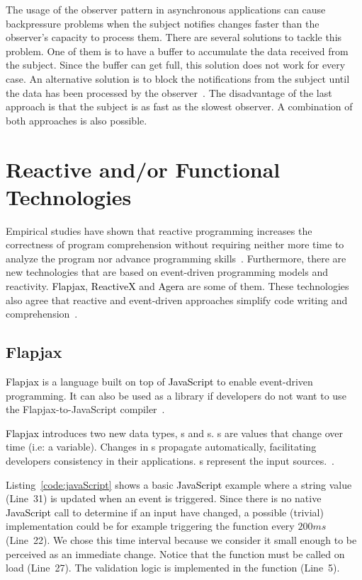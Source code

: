 \documentclass[type=bsc,accentcolor=tud9c]{tudthesis}
\newcommand{\framework}[1]{\textcolor{black}{#1}}
\begin{document}
The usage of the observer pattern in asynchronous applications can cause backpressure problems when the subject notifies changes faster than the observer's capacity to process them. There are several solutions to tackle this problem. One of them is to have a buffer to accumulate the data received from the subject. Since the buffer can get full, this solution does not work for every case. An alternative solution is to block the notifications from the subject until the data has been processed by the observer~\cite{rxJavaBackpressure}. The disadvantage of the last approach is that the subject is as fast as the slowest observer. A combination of both approaches is also possible.

\section{Reactive and/or Functional Technologies}
Empirical studies have shown that reactive programming increases the correctness of program comprehension without requiring neither more time to analyze the program nor advance programming skills~\cite{paperReactiveComprehension}. Furthermore, there are new technologies that are based on event-driven programming models and reactivity. \framework{Flapjax}, \framework{ReactiveX} and \framework{Agera} are some of them. These technologies also agree that reactive and event-driven approaches simplify code writing and comprehension~\cite{agera, reactiveX, paperFlapjax}.

\subsection{Flapjax}
\framework{Flapjax} is a language built on top of \framework{JavaScript} to enable event-driven programming. 
It can also be used as a library if developers do not want to use the Flapjax-to-JavaScript compiler~\cite{paperFlapjax}.

\framework{Flapjax} introduces two new data types, s and s. s are values that change over time  (i.e: a variable). Changes in s propagate automatically, facilitating developers consistency in their applications. s represent the input sources.~\cite{paperFlapjax}.

Listing~\ref{code:javaScript} shows a basic \framework{JavaScript} example where a string value  (Line~31) is updated when an event  is triggered. Since there is no native \framework{JavaScript} call to determine if an input have changed, a possible (trivial) implementation could be for example triggering the  function every $200ms$ (Line~22). We chose this time interval because we consider it small enough to be perceived as an immediate change. Notice that the function  must be called on load (Line~27). The validation logic is implemented in the function  (Line~5).
\end{document}
